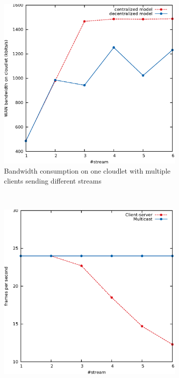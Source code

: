 \documentclass[letterpaper,twocolumn,10pt]{article}
\begin{document}
\begin{figure}[t]
        \centering
        \begin{subfigure}[t]{0.22\textwidth}
                \includegraphics[width=\textwidth]{pic/multiBandwidth.eps}
                \caption{Bandwidth consumption on one cloudlet with multiple clients sending different streams}
                \label{fig:mulBandwidth}
        \end{subfigure}%
        ~ %
        \begin{subfigure}[t]{0.22\textwidth}
                \includegraphics[width=\textwidth]{pic/fps.eps}

\end{subfigure}
\end{figure}
\end{document}
